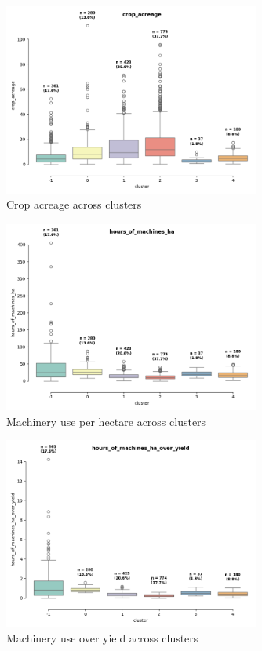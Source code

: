 \documentclass[a4paper,12pt]{article}
\begin{document}
\begin{figure}[h!]
    \centering
    \includegraphics[width=0.75\textwidth]{clustering_pipeline/output/20250404_boxplot_crop_acreage.png}
    \caption{Crop acreage across clusters}
\end{figure}

\begin{figure}[h!]
    \centering
    \includegraphics[width=0.75\textwidth]{clustering_pipeline/output/20250404_boxplot_hours_of_machines_ha.png}
    \caption{Machinery use per hectare across clusters}
\end{figure}

\begin{figure}[h!]
    \centering
    \includegraphics[width=0.75\textwidth]{clustering_pipeline/output/20250404_boxplot_hours_of_machines_ha_over_yield.png}
    \caption{Machinery use over yield across clusters}
\end{figure}
\end{document}
